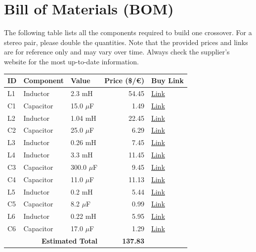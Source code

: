 \documentclass[11pt,a4paper]{report}
\begin{document}
\chapter{Bill of Materials (BOM)}
The following table lists all the components required to build one crossover. For a stereo pair, please double the quantities. Note that the provided prices and links are for reference only and may vary over time. Always check the supplier's website for the most up-to-date information.

\vspace{0.5cm}
\begin{table}[H]
    \centering
    \renewcommand{\arraystretch}{1.5}
    \begin{tabular}{@{}lllrl@{}}
        \toprule
        \textbf{ID} & \textbf{Component} & \textbf{Value} & \textbf{Price (\$/€)} & \textbf{Buy Link} \\
        \midrule
        L1 & Inductor & 2.3 mH & 54.45 & \href{https://www.soundimports.eu/en/jantzen-audio-000-8690.html}{Link} \\
        C1 & Capacitor & 15.0 $\mu$F & 1.49 & \href{https://www.soundimports.eu/en/jantzen-audio-001-6141.html}{Link} \\
        L2 & Inductor & 1.04 mH & 22.45 & \href{https://www.soundimports.eu/en/jantzen-audio-000-1047.html}{Link} \\
        C2 & Capacitor & 25.0 $\mu$F & 6.29 & \href{https://www.parts-express.com/Dayton-Audio-PMPC-25-25uF-250V-Precision-Audio-Capacitor-027-256}{Link} \\
        L3 & Inductor & 0.26 mH & 7.45 & \href{https://www.soundimports.eu/en/jantzen-audio-000-1728.html}{Link} \\
        L4 & Inductor & 3.3 mH & 11.45 & \href{https://www.soundimports.eu/en/jantzen-audio-000-5161.html}{Link} \\
        C3 & Capacitor & 300.0 $\mu$F & 9.45 & \href{https://www.soundimports.eu/en/jantzen-audio-001-6186.html}{Link} \\
        C4 & Capacitor & 11.0 $\mu$F & 11.13 & \href{https://www.parts-express.com/Solen-11uF-400V-Polypropylene-Capacitor-027-571}{Link} \\
        L5 & Inductor & 0.2 mH & 5.44 & \href{https://www.soundimports.eu/en/dayton-audio-lw18-20.html}{Link} \\
        C5 & Capacitor & 8.2 $\mu$F & 0.99 & \href{https://www.soundimports.eu/en/it-intertechnik-elcr-8-2-100.html}{Link} \\
        L6 & Inductor & 0.22 mH & 5.95 & \href{https://www.soundimports.eu/en/dayton-audio-lw18-22.html}{Link} \\
        C6 & Capacitor & 17.0 $\mu$F & 1.29 & \href{https://www.parts-express.com/17uF-100V-Non-Polarized-Capacitor-027-346}{Link} \\
        \midrule
        \multicolumn{3}{r}{\textbf{Estimated Total}} & \textbf{137.83} & \\
        \bottomrule
    \end{tabular}
\end{table}
\end{document}
